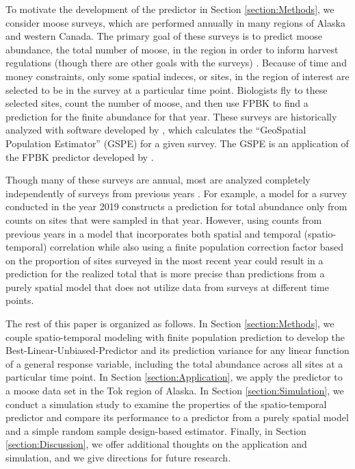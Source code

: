 \documentclass[]{interact}
\theoremstyle{plain}%
\theoremstyle{definition}
\theoremstyle{remark}
\begin{document}
To motivate the development of the predictor in Section
\ref{section:Methods}, we consider moose surveys, which are performed
annually in many regions of Alaska and western Canada. The primary goal
of these surveys is to predict moose abundance, the total number of
moose, in the region in order to inform harvest regulations (though
there are other goals with the surveys) \citep{kellie2019challenges}.
Because of time and money constraints, only some spatial indeces, or
sites, in the region of interest are selected to be in the survey at a
particular time point. Biologists fly to these selected sites, count the
number of moose, and then use FPBK to find a prediction for the finite
abundance for that year. These surveys are historically analyzed with
software developed by \citet{delong2006geospatial}, which calculates the
``GeoSpatial Population Estimator'' (GSPE) for a given survey. The GSPE
is an application of the FPBK predictor developed by
\citet{ver2008spatial}.

Though many of these surveys are annual, most are analyzed completely
independently of surveys from previous years
\citep[e.g.][]{gasaway1986estimating, kellie_geospatial_2006, boertje2009managing, peters2014contrasting}.
For example, a model for a survey conducted in the year 2019 constructs
a prediction for total abundance only from counts on sites that were
sampled in that year. However, using counts from previous years in a
model that incorporates both spatial and temporal (spatio-temporal)
correlation while also using a finite population correction factor based
on the proportion of sites surveyed in the most recent year could result
in a prediction for the realized total that is more precise than
predictions from a purely spatial model that does not utilize data from
surveys at different time points.

The rest of this paper is organized as follows. In Section
\ref{section:Methods}, we couple spatio-temporal modeling with finite
population prediction to develop the Best-Linear-Unbiased-Predictor and
its prediction variance for any linear function of a general response
variable, including the total abundance across all sites at a particular
time point. In Section \ref{section:Application}, we apply the predictor
to a moose data set in the Tok region of Alaska. In Section
\ref{section:Simulation}, we conduct a simulation study to examine the
properties of the spatio-temporal predictor and compare its performance
to a predictor from a purely spatial model and a simple random sample
design-based estimator. Finally, in Section \ref{section:Discussion}, we
offer additional thoughts on the application and simulation, and we give
directions for future research.
\end{document}
